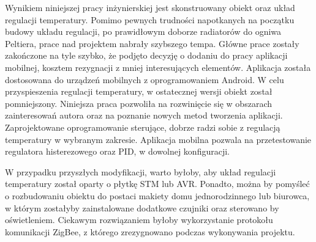 Wynikiem niniejszej pracy inżynierskiej jest skonstruowany obiekt oraz układ regulacji temperatury. Pomimo pewnych trudności napotkanych na początku budowy układu regulacji, po prawidłowym doborze radiatorów do ogniwa Peltiera, prace nad projektem nabrały szybszego tempa. Główne prace zostały zakończone na tyle szybko, że podjęto decyzję o dodaniu do pracy aplikacji mobilnej, kosztem rezygnacji z mniej interesujących elementów. Aplikacja została dostosowana do urządzeń mobilnych z oprogramowaniem Android. W celu przyspieszenia regulacji temperatury, w ostatecznej wersji obiekt został pomniejszony. Niniejsza praca pozwoliła na rozwinięcie się w obszarach zainteresowań autora oraz na poznanie nowych metod tworzenia aplikacji. Zaprojektowane oprogramowanie sterujące, dobrze radzi sobie z regulacją temperatury w wybranym zakresie. Aplikacja mobilna pozwala na przetestowanie regulatora histerezowego oraz PID, w dowolnej konfiguracji.

W przypadku przyszłych modyfikacji, warto byłoby, aby układ regulacji temperatury został oparty o płytkę STM lub AVR. Ponadto, można by pomyśleć o rozbudowaniu obiektu do postaci makiety domu jednorodzinnego lub biurowca, w którym zostałyby zainstalowane dodatkowe czujniki oraz sterowano by oświetleniem. Ciekawym rozwiązaniem byłoby wykorzystanie protokołu komunikacji ZigBee, z którego zrezygnowano podczas wykonywania projektu.
